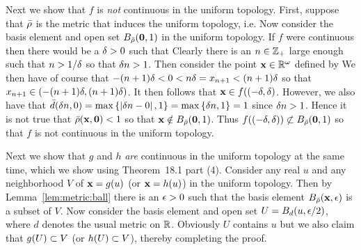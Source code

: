 {{    Next we show that $f$ is \emph{not} continuous in the uniform topology.
    First, suppose that $\br$ is the metric that induces the uniform topology, i.e.
    Now consider the basis element and open set $B_{\br}(\vze, 1)$ in the uniform topology.
    If $f$ were continuous then there would be a $\d > 0$ such that
    Clearly there is an $n \in \pints$ large enough such that $n > 1/\d$ so that $\d n > 1$.
    Then consider the point $\vx \in \reals^\w$ defined by
    We then have of course that $-(n+1)\d < 0 < n\d = x_{n+1} < (n+1)\d$ so that $x_{n+1} \in (-(n+1)\d, (n+1)\d)$.
    It then follows that $\vx \in f((-\d, \d)$.
    However, we also have that $\bd(\d n, 0) = \max\braces{\abs{\d n - 0}, 1} = \max\braces{\d n, 1} = 1$ since $\d n > 1$.
    Hence it is not true that $\br(\vx, \vze) < 1$ so that $\vx \notin B_{\br}(\vze, 1)$.
    Thus $f((-\d, \d)) \nss B_{\br}(\vze, 1)$ so that $f$ is not continuous in the uniform topology.

    Next we show that $g$ and $h$ \emph{are} continuous in the uniform topology at the same time, which we show using Theorem~18.1 part (4).
    Consider any real $u$ and any neighborhood $V$ of $\vx = g(u)$ (or $\vx = h(u)$) in the uniform topology.
    Then by Lemma~\ref{lem:metric:ball} there is an $\e > 0$ such that the basis element $B_{\br}(\vx, \e)$ is a subset of $V$.
    Now consider the basis element and open set $U = B_d(u, \e/2)$, where $d$ denotes the usual metric on $\reals$.
    Obviously $U$ contains $u$ but we also claim that $g(U) \ss V$ (or $h(U) \ss V$), thereby completing the proof.

}}
